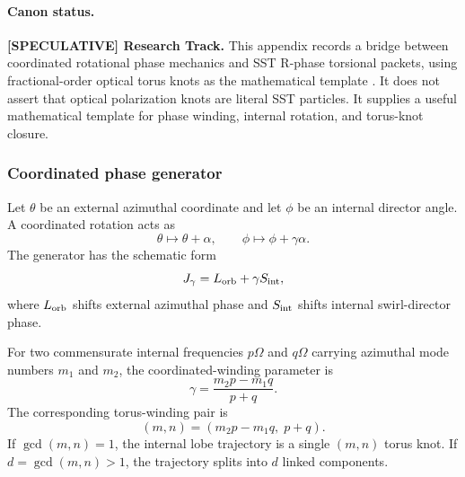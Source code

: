 \paragraph{Canon status.}
\textbf{[SPECULATIVE] Research Track.}
This appendix records a bridge between coordinated rotational phase mechanics and SST R-phase torsional packets, using fractional-order optical torus knots as the mathematical template \cite{Pisanty2018FractionalKnotsLight}. It does not assert that optical polarization knots are literal SST particles. It supplies a useful mathematical template for phase winding, internal rotation, and torus-knot closure.

\subsubsection{Coordinated phase generator}
Let $\theta$ be an external azimuthal coordinate and let $\phi$ be an internal director angle. A coordinated rotation acts as
\begin{equation}
    \theta\mapsto \theta+\alpha,
    \qquad
    \phi\mapsto \phi+\gamma\alpha.
\end{equation}
The generator has the schematic form
\begin{equation}
    J_\gamma = L_{\rm orb}+\gamma S_{\rm int},
    \label{eq:jgamma_sst}
\end{equation}
where $L_{\rm orb}$ shifts external azimuthal phase and $S_{\rm int}$ shifts internal swirl-director phase.

For two commensurate internal frequencies $p\Omega$ and $q\Omega$ carrying azimuthal mode numbers $m_1$ and $m_2$, the coordinated-winding parameter is
\begin{equation}
    \gamma
    =\frac{m_2p-m_1q}{p+q}.
    \label{eq:gamma_fractional_winding}
\end{equation}
The corresponding torus-winding pair is
\begin{equation}
    (m,n)=\left(m_2p-m_1q,\;p+q\right).
    \label{eq:torus_pair_fractional_phase}
\end{equation}
If $\gcd(m,n)=1$, the internal lobe trajectory is a single $(m,n)$ torus knot. If $d=\gcd(m,n)>1$, the trajectory splits into $d$ linked components.

